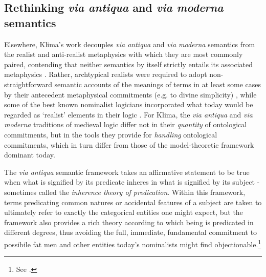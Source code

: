 \documentclass[]{article}
\begin{document}
\subsection{Rethinking \emph{via antiqua} and \emph{via moderna} semantics}
Elsewhere, Klima's work decouples \emph{via antiqua} and \emph{via moderna} semantics 
from the realist and anti-realist metaphysics with which they are most commonly paired,
contending that neither semantics by itself strictly entails its associated metaphysics \autocite{Klima1999,Klima2011}. 
Rather, archtypical realists were required to adopt non-straightforward semantic accounts of the meanings of terms in at least some cases by their antecedent metaphysical commitments (e.g. to divine simplicity) \autocite{Klima2002b},
while some of the best known nominalist logicians incorporated what today would be regarded as `realist' elements in their logic \autocite{Klima2005}. 
For Klima, the \emph{via antiqua} and \emph{via moderna} traditions of medieval logic 
differ not in their \emph{quantity} of ontological commitments, 
but in the tools they provide for \emph{handling} ontological commitments, 
which in turn differ from those of the model-theoretic framework dominant today. 

The \emph{via antiqua} semantic framework takes an affirmative statement to be true when what is signified by its predicate inheres in what is signified by its subject - 
sometimes called the \emph{inherence theory of predication}. 
Within this framework, 
terms predicating common natures or accidental features of a subject are taken to ultimately refer to exactly the categorical entities one might expect, 
but the framework also provides a rich theory according to which being is predicated in different degrees, 
thus avoiding the full, immediate, fundamental commitment to possibile fat men 
and other entities today's nominalists might find objectionable.\footnote{See \autocite{Klima2002}.}
\end{document}
